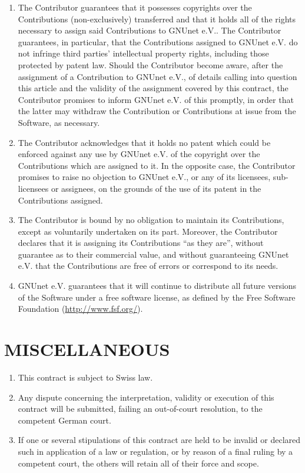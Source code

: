 \documentclass[a4paper]{article} %
\newenvironment{enumpar}{%
  \renewcommand{\labelenumi}{\theenumi}%
  \renewcommand{\theenumi}{(\arabic{enumi})}%
  \renewcommand{\labelenumii}{\theenumii}%
  \renewcommand{\theenumii}{(\alph{enumii})}%
  \begin{enumerate}}
{\end{enumerate}}
\begin{document}
\begin{enumpar}
 \item The Contributor guarantees that it possesses copyrights over
   the Contributions (non-exclusively) transferred and that it holds
   all of the rights necessary to assign said Contributions to GNUnet
   e.V.. The Contributor guarantees, in particular, that the
   Contributions assigned to GNUnet e.V.  do not infringe third
   parties' intellectual property rights, including those protected by
   patent law.  Should the Contributor become aware, after the
   assignment of a Contribution to GNUnet e.V., of details calling
   into question this article and the validity of the assignment
   covered by this contract, the Contributor promises to inform GNUnet
   e.V. of this promptly, in order that the latter may withdraw the
   Contribution or Contributions at issue from the Software, as
   necessary.
 \item The Contributor acknowledges that it holds no patent which
   could be enforced against any use by GNUnet e.V. of the copyright over
   the Contributions which are assigned to it. In the opposite case,
   the Contributor promises to raise no objection to GNUnet e.V., or any of
   its licensees, sub- licensees or assignees, on the grounds of the
   use of its patent in the Contributions assigned.
 \item The Contributor is bound by no obligation to maintain its
   Contributions, except as voluntarily undertaken on its
   part. Moreover, the Contributor declares that it is assigning its
   Contributions ``as they are'', without guarantee as to their
   commercial value, and without guaranteeing GNUnet e.V. that the
   Contributions are free of errors or correspond to its needs.
 \item GNUnet e.V. guarantees that it will continue to distribute
   all future versions of the Software under a free software license,
   as defined by the Free Software Foundation (\url{http://www.fsf.org/}).
\end{enumpar}

\section{MISCELLANEOUS}

\begin{enumpar}
 \item This contract is subject to Swiss law.
 \item Any dispute concerning the interpretation, validity or
   execution of this contract will be submitted, failing an
   out-of-court resolution, to the competent German court.
 \item If one or several stipulations of this contract are held to be
   invalid or declared such in application of a law or regulation, or
   by reason of a final ruling by a competent court, the others will
   retain all of their force and scope.
\end{enumpar}
\end{document}
